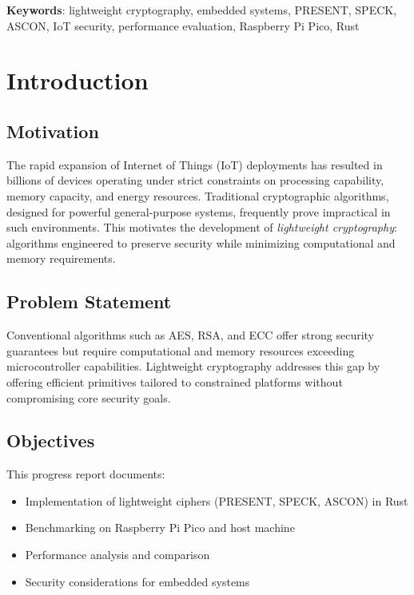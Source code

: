 \documentclass[12pt]{report}
\begin{document}
\vspace{0.3cm}
\textbf{Keywords}: lightweight cryptography, embedded systems, PRESENT, SPECK,
ASCON, IoT security, performance evaluation, Raspberry Pi Pico, Rust

\newpage
\tableofcontents

\newpage
\chapter{Introduction}

\section{Motivation}

The rapid expansion of Internet of Things (IoT) deployments has resulted in billions of
devices operating under strict constraints on processing capability, memory capacity,
and energy resources. Traditional cryptographic algorithms, designed for powerful general-purpose
systems, frequently prove impractical in such environments. This motivates the development of
\textit{lightweight cryptography}: algorithms engineered to preserve security while minimizing
computational and memory requirements.

\section{Problem Statement}

Conventional algorithms such as AES, RSA, and ECC offer strong security guarantees but
require computational and memory resources exceeding microcontroller capabilities.
Lightweight cryptography addresses this gap by offering efficient primitives tailored
to constrained platforms without compromising core security goals.

\section{Objectives}

This progress report documents:
\begin{itemize}
    \item Implementation of lightweight ciphers (PRESENT, SPECK, ASCON) in Rust
    \item Benchmarking on Raspberry Pi Pico and host machine
    \item Performance analysis and comparison
    \item Security considerations for embedded systems
\end{itemize}
\end{document}
